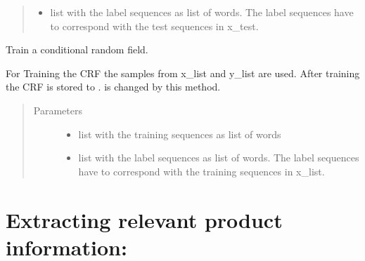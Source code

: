 \documentclass[letterpaper,10pt,english]{sphinxmanual}
\begin{document}
\begin{fulllineitems}
\begin{fulllineitems}
\begin{quote}
\begin{description}
\begin{itemize}
\item {} 
 \textendash{} list with the label sequences as list of words. The
label sequences have to correspond with the test sequences in
x\_test.

\end{itemize}

\end{description}\end{quote}

\end{fulllineitems}


\begin{fulllineitems}
\label{\detokenize{api:impressum_crf.ImpressumCRF.train}}
Train a conditional random field.

For Training the CRF the samples from x\_list and y\_list are
used. After training the CRF is stored to
.  is changed by this method.
\begin{quote}\begin{description}
\item[{Parameters}] \leavevmode\begin{itemize}
\item {} 
 \textendash{} list with the training sequences as list of words

\item {} 
 \textendash{} list with the label sequences as list of words. The
label sequences have to correspond with the training sequences
in x\_list.

\end{itemize}

\end{description}\end{quote}

\end{fulllineitems}


\end{fulllineitems}



\section{Extracting relevant product information:}
\label{\detokenize{api:module-information_extractor}}\label{\detokenize{api:extracting-relevant-product-information}}
\end{document}
